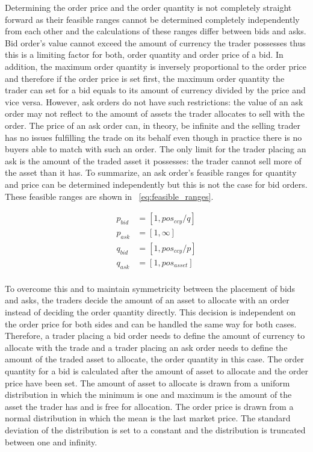 Determining the order price and the order quantity is not completely straight
forward as their feasible ranges cannot be determined completely independently
from each other and the calculations of these ranges differ between bids and asks. Bid order's
value cannot exceed the amount of currency the trader possesses thus this is 
a limiting factor for both, order quantity and order price of a bid. In addition,
the maximum order quantity is inversely proportional to the order price and
therefore if the order price is set first, the maximum order quantity the trader
can set for a bid equals to its amount of currency divided by the price and vice versa. 
However, ask orders do not have such restrictions: the value of an ask order
may not reflect to the amount of assets the trader allocates to sell with the order. The
price of an ask order can, in theory, be infinite and the selling trader has no issues
fulfilling the trade on its behalf even though in practice there is no buyers
able to match with such an order. The only limit for the trader placing an ask is the 
amount of the traded asset it possesses: the trader cannot sell more of the asset 
than it has. To summarize, an ask order's feasible ranges for quantity and price 
can be determined independently but this is not the case for bid orders. These feasible 
ranges are shown in ~\ref{eq:feasible_ranges}.

\begin{equation}
\begin{aligned}
p_{bid} &= \left[1, pos_{ccy} / q \right] \\
p_{ask} &= \left[1, \infty \right] \\
q_{bid} &= \left[1, pos_{ccy} / p\right] \\
q_{ask} &= \left[1, pos_{asset}\right] \\
\end{aligned}
\label{eq:feasible_ranges}
\end{equation}

To overcome this and to maintain symmetricity between the placement of bids and asks, 
the traders decide the amount of an asset to allocate with an order instead of deciding 
the order quantity directly. This decision is independent on the order price for both
sides and can be handled the same way for both cases. Therefore, a trader placing a bid order 
needs to define the amount of currency to allocate with the trade and a trader placing an ask
order needs to define the amount of the traded asset to allocate, the order quantity in this case. 
The order quantity for a bid is calculated after the amount of asset to allocate 
and the order price have been set. The amount of asset to allocate is drawn from a uniform
distribution in which the minimum is one and maximum is the amount of the asset the trader
has and is free for allocation. The order price is drawn from a normal distribution in which 
the mean is the last market price. The standard deviation of the distribution is set to a 
constant and the distribution is truncated between one and infinity.

